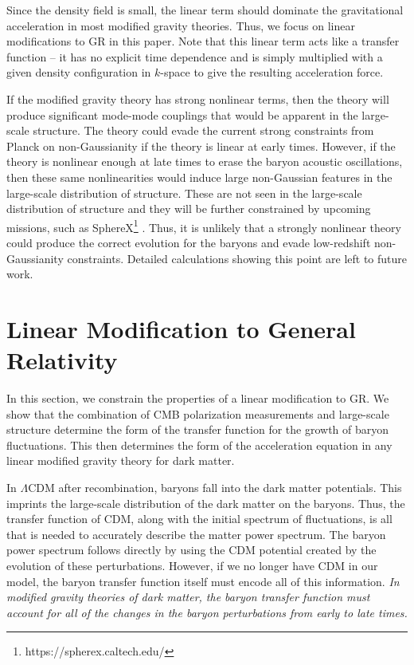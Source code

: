 \documentclass[floats,floatfix,showpacs,amssymb,amsmath,prl,twocolumn,superscriptaddress,nofootinbib, aps]{revtex4-2}
\begin{document}
Since the density field is small, the linear term should dominate the gravitational acceleration in most modified gravity theories. Thus, we focus on linear modifications to GR in this paper. Note that this linear term acts like a transfer function -- it has no explicit time dependence and is simply multiplied with a given density configuration in $k$-space to give the resulting acceleration force.

If the modified gravity theory has strong nonlinear terms, then the theory will produce significant mode-mode couplings that would be apparent in the large-scale structure. The theory could evade the current strong constraints from Planck on non-Gaussianity \citep{PlanckIX} if the theory is linear at early times. However, if the theory is nonlinear enough at late times to erase the baryon acoustic oscillations, then these same nonlinearities would induce large non-Gaussian features in the large-scale distribution of structure. These are not seen in the large-scale distribution of structure \citep{Slosar2008} and they will be further constrained by upcoming missions, such as SphereX\footnote{https://spherex.caltech.edu/} \citep{Dore2014}. Thus, it is unlikely that a strongly nonlinear theory could produce the correct evolution for the baryons and evade low-redshift non-Gaussianity constraints. Detailed calculations showing this point are left to future work.

\section{Linear Modification to General Relativity\label{sec:linear}}

In this section, we constrain the properties of a linear modification to GR. We show that the combination of CMB polarization measurements and large-scale structure determine the form of the transfer function for the growth of baryon fluctuations. This then determines the form of the acceleration equation in any linear modified gravity theory for dark matter.

In $\Lambda$CDM after recombination, baryons fall into the dark matter potentials. This imprints the large-scale distribution of the dark matter on the baryons. Thus, the transfer function of CDM, along with the initial spectrum of fluctuations, is all that is needed to accurately describe the matter power spectrum. The baryon power spectrum follows directly by using the CDM potential created by the evolution of these perturbations. However, if we no longer have CDM in our model, the baryon transfer function itself must encode all of this information. \textit{In modified gravity theories of dark matter, the baryon transfer function must account for all of the changes in the baryon perturbations from early to late times.}
\end{document}
